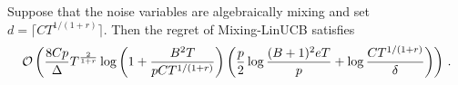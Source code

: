 \begin{corollary}
\label{cor2:algebraic_mixing}
Suppose that the noise variables are algebraically mixing and set $d=\lceil CT^{1/(1+r)}\rceil$. Then the regret of Mixing-LinUCB satisfies
\begin{equation*}
\mathcal{O}\left( \frac{8Cp}{\Delta}T^{\frac{2}{1+r}}\log\left(1 + \frac{B^2T}{pCT^{1/(1+r)}}\right)\left(\frac{p}{2}\log\frac{(B+1)^2eT}{p}+\log \frac{CT^{1/(1+r)}}{\delta}\right)\right)\,.
\end{equation*}
\label{cor:gap_reg_alg}
\end{corollary}


